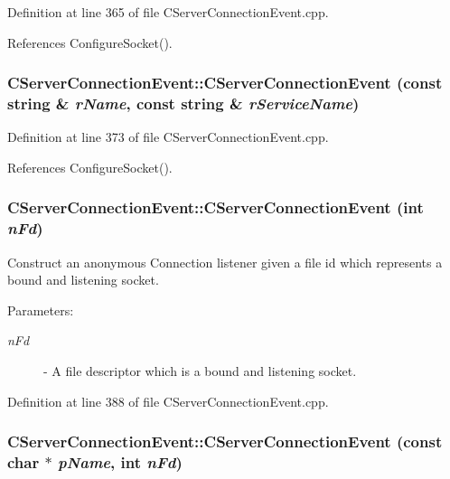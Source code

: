 Definition at line 365 of file CServer\-Connection\-Event.cpp.

References Configure\-Socket().
\subsubsection{\setlength{\rightskip}{0pt plus 5cm}CServer\-Connection\-Event::CServer\-Connection\-Event (const string \& {\em r\-Name}, const string \& {\em r\-Service\-Name})}\label{classCServerConnectionEvent_a5}




Definition at line 373 of file CServer\-Connection\-Event.cpp.

References Configure\-Socket().
\subsubsection{\setlength{\rightskip}{0pt plus 5cm}CServer\-Connection\-Event::CServer\-Connection\-Event (int {\em n\-Fd})}\label{classCServerConnectionEvent_a6}


Construct an anonymous Connection listener given a file id which represents a bound and listening socket.\begin{Desc}
\item[Parameters: ]\par
\begin{description}
\item[{\em 
n\-Fd}]- A file descriptor which is a bound and listening socket. \end{description}
\end{Desc}


Definition at line 388 of file CServer\-Connection\-Event.cpp.
\subsubsection{\setlength{\rightskip}{0pt plus 5cm}CServer\-Connection\-Event::CServer\-Connection\-Event (const char $\ast$ {\em p\-Name}, int {\em n\-Fd})}\label{classCServerConnectionEvent_a7}


